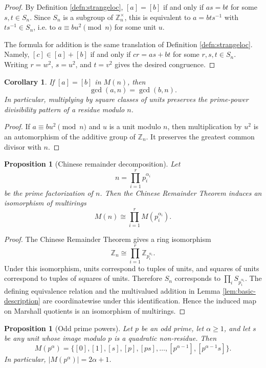 \documentclass[a4paper,10pt]{article}
\newtheorem{cor}[teo]{Corollary}
\newtheorem{prop}[teo]{Proposition}
\newcommand{\cl}[1]{\left[#1\right]}
\begin{document}
\begin{proof}
By Definition \ref{defn:strangeloc}, $\cl a=\cl b$ if and only if $as=bt$ for some $s,t\in S_n$.  Since $S_n$ is a subgroup of $\mathbb Z_n^\times$, this is equivalent to $a=bts^{-1}$ with $ts^{-1}\in S_n$, i.e. to $a\equiv bu^2\pmod n$ for some unit $u$.

The formula for addition is the same translation of Definition \ref{defn:strangeloc}.  Namely, $\cl c\in\cl a+\cl b$ if and only if $cr=as+bt$ for some $r,s,t\in S_n$.  Writing $r=w^2$, $s=u^2$, and $t=v^2$ gives the desired congruence.
\end{proof}

\begin{cor}\label{cor:gcd-invariant}
If $\cl a=\cl b$ in $M(n)$, then
\[
        \gcd(a,n)=\gcd(b,n).
\]
In particular, multiplying by square classes of units preserves the prime-power divisibility pattern of a residue modulo $n$.
\end{cor}

\begin{proof}
If $a\equiv bu^2\pmod n$ and $u$ is a unit modulo $n$, then multiplication by $u^2$ is an automorphism of the additive group of $\mathbb Z_n$.  It preserves the greatest common divisor with $n$.
\end{proof}

\begin{prop}[Chinese remainder decomposition]\label{prop:crt-Mn}
Let
\[
        n=\prod_{i=1}^r p_i^{\alpha_i}
\]
be the prime factorization of $n$.  Then the Chinese Remainder Theorem induces an isomorphism of multirings
\[
        M(n)\cong \prod_{i=1}^r M(p_i^{\alpha_i}).
\]
\end{prop}

\begin{proof}
The Chinese Remainder Theorem gives a ring isomorphism
\[
        \mathbb Z_n\cong\prod_{i=1}^r\mathbb Z_{p_i^{\alpha_i}}.
\]
Under this isomorphism, units correspond to tuples of units, and squares of units correspond to tuples of squares of units.  Therefore $S_n$ corresponds to $\prod_i S_{p_i^{\alpha_i}}$.  The defining equivalence relation and the multivalued addition in Lemma \ref{lem:basic-description} are coordinatewise under this identification.  Hence the induced map on Marshall quotients is an isomorphism of multirings.
\end{proof}

\begin{prop}[Odd prime powers]\label{prop:odd-prime-powers}
Let $p$ be an odd prime, let $\alpha\ge1$, and let $s$ be any unit whose image modulo $p$ is a quadratic non-residue.  Then
\[
        M(p^\alpha)=\{\cl0,\cl1,\cl s,\cl p,\cl{ps},\ldots,
        \cl{p^{\alpha-1}},\cl{p^{\alpha-1}s}\}.
\]
In particular, $|M(p^\alpha)|=2\alpha+1$.
\end{prop}
\end{document}
